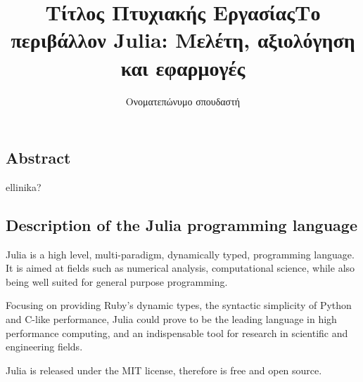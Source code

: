 \documentclass[11pt,a4paper,english,greek,twoside]{thesis}
\title{Τίτλος Πτυχιακής Εργασίας}
\author{Ονοματεπώνυμο σπουδαστή}
\begin{document}
\maketitle

\frontmatter	
%	
% 


\mainmatter

%    
%    
%	

%	

%	

	\title{Το περιβάλλον Julia: Μελέτη, αξιολόγηση και
εφαρμογές}\label{ux3c4ux3bf-ux3c0ux3b5ux3c1ux3b9ux3b2ux3acux3bbux3bbux3bfux3bd-julia-ux3bcux3b5ux3bbux3adux3c4ux3b7-ux3b1ux3beux3b9ux3bfux3bbux3ccux3b3ux3b7ux3c3ux3b7-ux3baux3b1ux3b9-ux3b5ux3c6ux3b1ux3c1ux3bcux3bfux3b3ux3adux3c2}

\subsection{Abstract}\label{abstract}

ellinika?

\subsection{Description of the Julia programming
language}\label{description-of-the-julia-programming-language}

Julia is a high level, multi-paradigm, dynamically typed, programming
language. It is aimed at fields such as numerical analysis,
computational science, while also being well suited for general purpose
programming.

Focusing on providing Ruby's dynamic types, the syntactic simplicity of
Python and C-like performance, Julia could prove to be the leading
language in high performance computing, and an indispensable tool for
research in scientific and engineering fields.

Julia is released under the MIT license, therefore is free and open
source.
\end{document}
